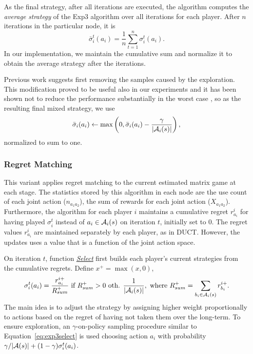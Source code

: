 As the final strategy, after all iterations are executed, the algorithm computes the \emph{average strategy} of the Exp3 algorithm over all iterations for each player. After $n$ iterations in the particular node, it is
\begin{equation}
\bar{\sigma}^t_i(a_i) = \frac{1}{n}\sum_{t=1}^n \sigma^t_i(a_i).
\end{equation}
In our implementation, we maintain the cumulative sum and normalize it to obtain the average strategy after the iterations.

Previous work \cite{Teytaud11Upper} suggests first removing the samples caused by the exploration.
This modification proved to be useful also in our experiments and it has been shown not to reduce the performance substantially in the worst case \cite{kovarik},  so as the resulting final mixed strategy, we use
\begin{equation}
\bar{\sigma}_i(a_i) \leftarrow \max\left(0, \bar{\sigma}_i(a_i) - \frac{\gamma}{|\mathcal{A}_i(s)|}\right),
\end{equation}
normalized to sum to one.

\subsubsection{Regret Matching} \label{sec:rm}

This variant applies regret matching \cite{Hart00} to the current estimated matrix game at each stage. The statistics stored by this algorithm in each node are the use count of each joint action ($n_{a_1a_2}$), the sum of rewards for each joint action ($X_{a_1a_2}$). Furthermore, the algorithm for each player $i$ maintains a cumulative regret $r^i_{a_i}$ for having played $\sigma_i^t$ instead of $a_i \in \mathcal{A}_i(s)$ on iteration $t$, initially set to 0. The regret values $r^i_{a_i}$ are maintained separately by each player, as in DUCT. However, the updates uses a value that is a function of the joint action space. 

On iteration $t$, function \emph{\underline{Select}} first builds
each player's current strategies from the cumulative regrets. Define $x^+ = \max(x,0)$,
\begin{equation}
\label{eq:rm}
\sigma^t_i(a_i) = \frac{r^{i+}_{a_i}}{R^+_{sum}} \mbox{ if } R^+_{sum} > 0 
\mbox{ oth. } \frac{1}{|\mathcal{A}_i(s)|}, \mbox{ where } R^+_{sum} = \sum_{b_i \in \mathcal{A}_i(s)}{r^{i+}_{b_i}}.
\end{equation}
The main idea is to adjust the strategy by assigning higher weight proportionally to actions based on the regret of having not taken them over the long-term.
To ensure exploration, an $\gamma$-on-policy sampling procedure similar to Equation~\ref{eq:exp3select} is used
choosing action $a_i$ with probability $\gamma/|\mathcal{A}(s)| + (1-\gamma) \sigma^t_i(a_i)$.

